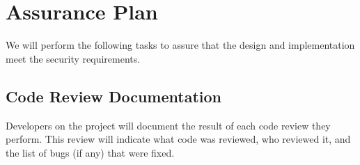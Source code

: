 \section{Assurance Plan}
\label{section:assure}

We will perform the following tasks to assure that the design and
implementation meet the security requirements.

\subsection{Code Review Documentation}
Developers on the project will document the result of each code review they
perform.  This review will indicate what code was reviewed, who reviewed it,
and the list of bugs (if any) that were fixed.
